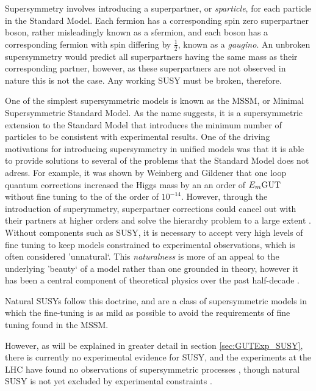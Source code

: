 \documentclass{article}
\begin{document}
Supersymmetry involves introducing a superpartner, or \textit{sparticle}, for each particle in the Standard Model. Each fermion has a corresponding spin zero superpartner boson, rather misleadingly known as a sfermion, and each boson has a corresponding fermion with spin differing by $\frac{1}{2}$, known as a \textit{gaugino}. An unbroken supersymmetry would predict all superpartners having the same mass as their corresponding partner, however, as these superpartners are not observed in nature this is not the case. Any working SUSY must be broken, therefore.

One of the simplest supersymmetric models is known as the MSSM, or Minimal Supersymmetric Standard Model. As the name suggests, it is a supersymmetric extension to the Standard Model that introduces the minimum number of particles to be consistent with experimental results.
One of the driving motivations for introducing supersymmetry in unified models was that it is able to provide solutions to several of the problems that the Standard Model does not adress. For example,  it was shown by Weinberg \cite{HierarchyProblem1} and Gildener \cite{HierarchyProblem2} that one loop quantum corrections increased the Higgs mass by an an order of $E_m\rm{GUT}$ without fine tuning to the of the order of $10^{-14}$. However, through the introduction of superymmetry, superpartner corrections could cancel out with their partners at higher orders and solve the hierarchy problem to a large extent \cite{SUSYHierarchyProblem}. Without components such as SUSY, it is necessary to accept very high levels of fine tuning to keep models constrained to experimental observations, which is often considered 'unnatural`. This \textit{naturalness} is more of an appeal to the underlying 'beauty` of a model rather than one grounded in theory, however it has been a central component of theoretical physics over the past half-decade \cite{Naturalness}.

Natural SUSYs follow this doctrine, and are a class of supersymmetric models in which the fine-tuning is as mild as possible \cite{NaturalSUSY} to avoid the requirements of fine tuning found in the MSSM.

However, as will be explained in greater detail in section \ref{sec:GUTExp_SUSY}, there is currently no experimental evidence for SUSY, and the experiments at the LHC have found no observations of supersymmetric processes \cite{SUSYSearch1}, though natural SUSY is not yet excluded by experimental constraints \cite{NaturalSUSYConstraints}.
\end{document}
